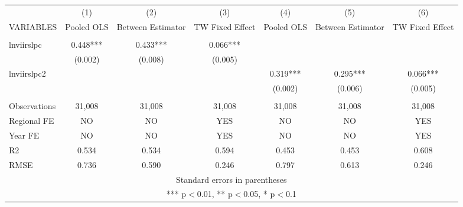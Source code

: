 \documentclass[]{article}
\begin{document}
\begin{tabular}{lcccccc} \hline
 & (1) & (2) & (3) & (4) & (5) & (6) \\
VARIABLES & Pooled OLS & Between Estimator & TW Fixed Effect & Pooled OLS & Between Estimator & TW Fixed Effect \\ \hline
 &  &  &  &  &  &  \\
lnviirslpc & 0.448*** & 0.433*** & 0.066*** &  &  &  \\
 & (0.002) & (0.008) & (0.005) &  &  &  \\
lnviirslpc2 &  &  &  & 0.319*** & 0.295*** & 0.066*** \\
 &  &  &  & (0.002) & (0.006) & (0.005) \\
 &  &  &  &  &  &  \\
Observations & 31,008 & 31,008 & 31,008 & 31,008 & 31,008 & 31,008 \\
Regional FE & NO & NO & YES & NO & NO & YES \\
Year FE & NO & NO & YES & NO & NO & YES \\
R2 & 0.534 & 0.534 & 0.594 & 0.453 & 0.453 & 0.608 \\
 RMSE & 0.736 & 0.590 & 0.246 & 0.797 & 0.613 & 0.246 \\ \hline
\multicolumn{7}{c}{ Standard errors in parentheses} \\
\multicolumn{7}{c}{ *** p$<$0.01, ** p$<$0.05, * p$<$0.1} \\
\end{tabular}
\end{document}
